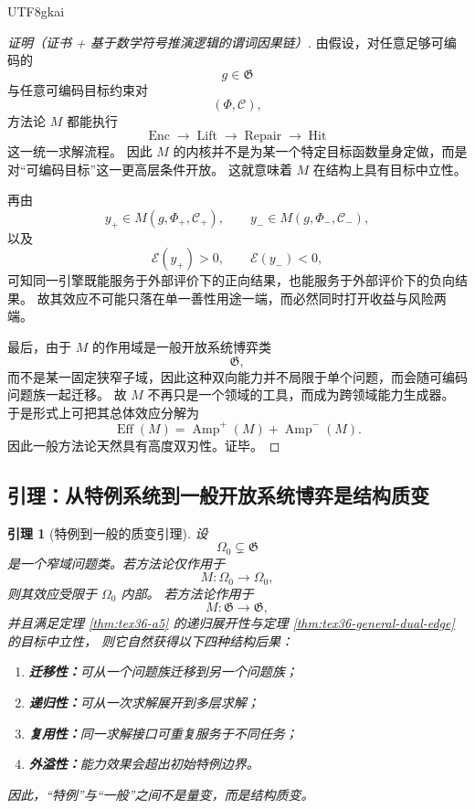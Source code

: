 \documentclass[12pt]{article}
\newtheorem{lemma}{引理}[section]
\begin{document}
\begin{CJK*}{UTF8}{gkai}
\begin{proof}[证明（证书 + 基于数学符号推演逻辑的谓词因果链）]
由假设，对任意足够可编码的
\[
  g\in \mathfrak G
\]
与任意可编码目标约束对
\[
  (\Phi,\mathcal C),
\]
方法论 $M$ 都能执行
\[
  \operatorname{Enc}
  \to
  \operatorname{Lift}
  \to
  \operatorname{Repair}
  \to
  \operatorname{Hit}
\]
这一统一求解流程。
因此 $M$ 的内核并不是为某一个特定目标函数量身定做，而是对“可编码目标”这一更高层条件开放。
这就意味着 $M$ 在结构上具有目标中立性。

再由
\[
  y_{+}\in M(g,\Phi_{+},\mathcal C_{+}),
  \qquad
  y_{-}\in M(g,\Phi_{-},\mathcal C_{-}),
\]
以及
\[
  \mathcal E(y_{+})>0,
  \qquad
  \mathcal E(y_{-})<0,
\]
可知同一引擎既能服务于外部评价下的正向结果，也能服务于外部评价下的负向结果。
故其效应不可能只落在单一善性用途一端，而必然同时打开收益与风险两端。

最后，由于 $M$ 的作用域是一般开放系统博弈类
\[
  \mathfrak G,
\]
而不是某一固定狭窄子域，因此这种双向能力并不局限于单个问题，而会随可编码问题族一起迁移。
故 $M$ 不再只是一个领域的工具，而成为跨领域能力生成器。
于是形式上可把其总体效应分解为
\[
  \operatorname{Eff}(M)
  =
  \operatorname{Amp}^{+}(M)
  +
  \operatorname{Amp}^{-}(M).
\]
因此一般方法论天然具有高度双刃性。证毕。
\end{proof}

\subsection{引理：从特例系统到一般开放系统博弈是结构质变}
\label{subsec:tex36-special-vs-general}

\begin{lemma}[特例到一般的质变引理]
\label{lem:tex36-special-vs-general}
设
\[
  \Omega_0\subsetneq \mathfrak G
\]
是一个窄域问题类。若方法论仅作用于
\[
  M:\Omega_0\to \Omega_0,
\]
则其效应受限于 $\Omega_0$ 内部。
若方法论作用于
\[
  M:\mathfrak G\to \mathfrak G,
\]
并且满足定理 \ref{thm:tex36-a5} 的递归展开性与定理 \ref{thm:tex36-general-dual-edge} 的目标中立性，
则它自然获得以下四种结构后果：
\begin{enumerate}
  \item \textbf{迁移性：}可从一个问题族迁移到另一个问题族；
  \item \textbf{递归性：}可从一次求解展开到多层求解；
  \item \textbf{复用性：}同一求解接口可重复服务于不同任务；
  \item \textbf{外溢性：}能力效果会超出初始特例边界。
\end{enumerate}
因此，“特例”与“一般”之间不是量变，而是结构质变。
\end{lemma}


\end{CJK*}
\end{document}
